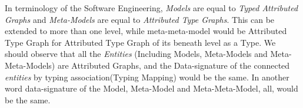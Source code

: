 In terminology of the Software Engineering, {\em Models} are equal to {\em Typed Attributed Graphs} and {\em Meta-Models} are equal to {\em Attributed Type Graphs}. This can be extended to more than one level, while meta-meta-model would be Attributed Type Graph for Attributed Type Graph of its beneath level as a Type. We should observe that all the {\em Entities} (Including Models, Meta-Models and Meta-Meta-Models) are Attributed Graphs, and the Data-signature of the connected {\em entities} by typing association(Typing Mapping) would be the same. In another word data-signature of the Model, Meta-Model and Meta-Meta-Model, all, would be the same.